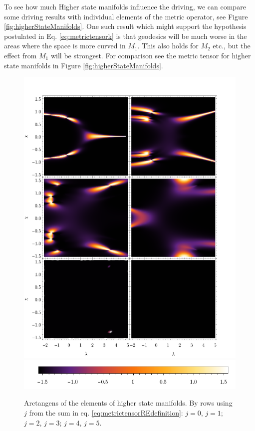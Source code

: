 To see how much Higher state manifolds influence the driving, we can compare some driving results with individual elements of the metric operator, see Figure \ref{fig:higherStateManifolds}. One such result which might support the hypothesis postulated in Eq. \ref{eq:metrictensork} is that geodesics will be much worse in the areas where the space is more curved in $M_1$. This also holds for $M_2$ etc., but the effect from $M_1$ will be strongest. For comparison see the metric tensor for higher state manifolds in Figure \ref{fig:higherStateManifolds}.

\begin{figure}[H]
    \centering
    \includegraphics[scale=1.2]{../img/N=5_metricDeterminantElements.pdf}
    \includegraphics[scale=1.2]{../img/N=3_barA.pdf}
    \caption{Arctangens of the elements of higher state manifolds. By rows using $j$ from the sum in eq. \ref{eq:metrictensorREdefinition}: $j=0$, $j=1$; $j=2$, $j=3$; $j=4$, $j=5$.}
    \label{fig:metricDeterminantElements}    
\end{figure}

